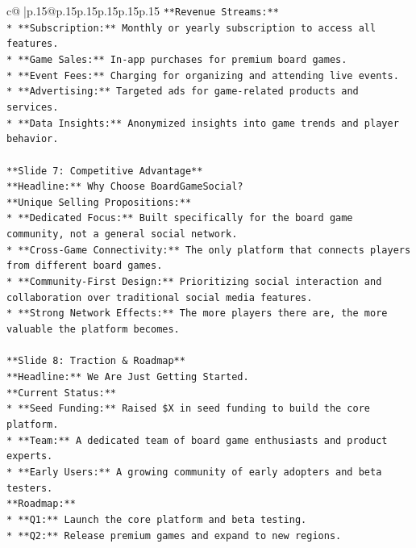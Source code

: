 \documentclass{article}
\begin{document}
{\begin{supertabular}{c@{$\;$}|p{.15\linewidth}@{}p{.15\linewidth}p{.15\linewidth}p{.15\linewidth}p{.15\linewidth}p{.15\linewidth}}
{{{\texttt{**Revenue Streams:**} \\
\texttt{*   **Subscription:** Monthly or yearly subscription to access all features.} \\
\texttt{*   **Game Sales:** In{-}app purchases for premium board games.} \\
\texttt{*   **Event Fees:** Charging for organizing and attending live events.} \\
\texttt{*   **Advertising:** Targeted ads for game{-}related products and services.} \\
\texttt{*   **Data Insights:** Anonymized insights into game trends and player behavior.} \\
\\ 
\texttt{**Slide 7: Competitive Advantage**} \\
\texttt{**Headline:** Why Choose BoardGameSocial?} \\
\texttt{**Unique Selling Propositions:**} \\
\texttt{*   **Dedicated Focus:** Built specifically for the board game community, not a general social network.} \\
\texttt{*   **Cross{-}Game Connectivity:** The only platform that connects players from different board games.} \\
\texttt{*   **Community{-}First Design:** Prioritizing social interaction and collaboration over traditional social media features.} \\
\texttt{*   **Strong Network Effects:** The more players there are, the more valuable the platform becomes.} \\
\\ 
\texttt{**Slide 8: Traction \& Roadmap**} \\
\texttt{**Headline:** We Are Just Getting Started.} \\
\texttt{**Current Status:**} \\
\texttt{*   **Seed Funding:** Raised \$X in seed funding to build the core platform.} \\
\texttt{*   **Team:** A dedicated team of board game enthusiasts and product experts.} \\
\texttt{*   **Early Users:** A growing community of early adopters and beta testers.} \\
\texttt{**Roadmap:**} \\
\texttt{*   **Q1:** Launch the core platform and beta testing.} \\
\texttt{*   **Q2:** Release premium games and expand to new regions.} \\
}}}
\end{supertabular}}
\end{document}
